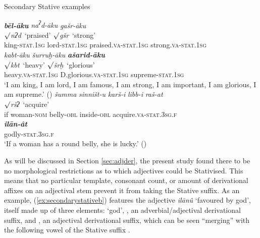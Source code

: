 \documentclass[output=paper,colorlinks,citecolor=brown]{langscibook}
\begin{document}
\begin{exe}  \ex Secondary Stative examples\label{ex:secondarystative}
    \begin{xlist} \ex \label{ex:secstata}  {\textit{\textbf{bēl-āku}} } \textit{na\textsuperscript{ʔ}d-āku} \textit{gašr-āku}\\
        {} {} ${\surd}$\textit{nʔd}~`praised' ${\surd}$\textit{gšr}~`strong' \\
        	 king-\textsc{stat.1sg} lord-\textsc{stat.1sg} praised.\textsc{va}-\textsc{stat.1sg} strong.\textsc{va}-\textsc{stat.1sg}\\
    \glll \textit{kabt-āku} \textit{šurruḫ-āku} \textit{\textbf{ašarid-āku}} \\
${\surd}$\textit{kbt}~`heavy' ${\surd}$\textit{šrḫ}~`glorious' {} \\
 heavy.\textsc{va}-\textsc{stat.1sg} D.glorious.\textsc{va}-\textsc{stat.1sg} supreme-\textsc{stat.1sg}\\
	\glt `I am king, I am lord, I am famous, I am strong, I am important, I am glorious, I am supreme.' ()
  \ex \label{ex:secondarystativeb} \glll 
\textit{šumma} \textit{sinništ-u} \textit{karš-i} \textit{libb-i} \textit{raš-at} \\
{} {} {} {} ${\surd}$\textit{ršʔ}~`acquire' \\
if woman-\textsc{nom} belly-\textsc{obl} inside-\textsc{obl} acquire.\textsc{va-stat.3sg.f} \\
\gll 
\textit{\textbf{ilān-ât}} \\
godly-\textsc{stat.3sg.f} \\
    \glt `If a woman has a round belly, she is lucky.' ()
    \end{xlist}    
\end{exe}

 As will be discussed in Section \ref{sec:adjder}, the present study found there to be no morphological restrictions as to which adjectives could be Stativised. This means that no particular template, consonant count, or amount of derivational affixes on an adjectival stem prevent it from taking the Stative suffix. As an example, (\ref{ex:secondarystativeb}) features the adjective \textit{ilānû} `favoured by god', itself made up of three elements:  `god', , an adverbial/adjectival derivational suffix, and , an adjectival derivational suffix, which can be seen “merging” with the following vowel of the Stative suffix .
\end{document}
